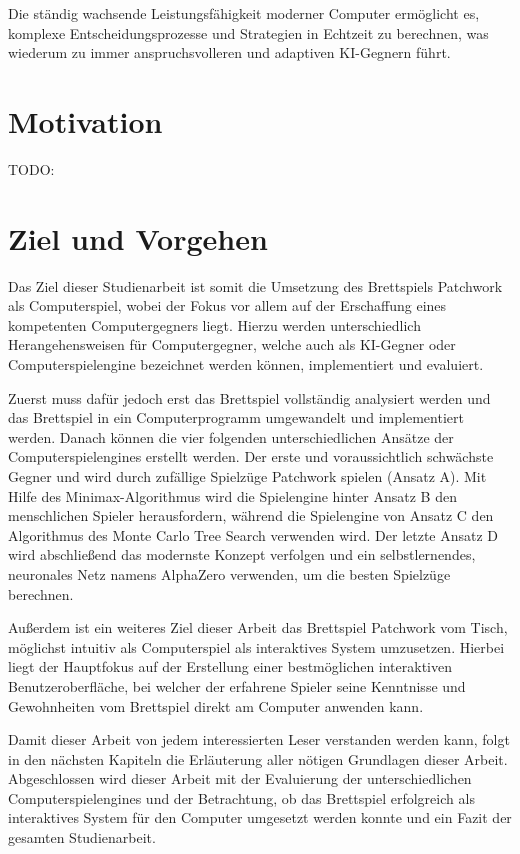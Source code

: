 Die ständig wachsende Leistungsfähigkeit moderner Computer ermöglicht es, komplexe Entscheidungsprozesse und Strategien in Echtzeit zu berechnen, was wiederum zu immer anspruchsvolleren und adaptiven \ac{KI}-Gegnern führt.

\section{Motivation}
\label{chapter:motivation}

TODO:

\section{Ziel und Vorgehen}
\label{chapter:ziel-und-vorgehen}

Das Ziel dieser Studienarbeit ist somit die Umsetzung des Brettspiels Patchwork als Computerspiel, wobei der Fokus vor allem auf der Erschaffung eines kompetenten Computergegners liegt. Hierzu werden unterschiedlich Herangehensweisen für Computergegner, welche auch als \ac{KI}-Gegner oder Computerspielengine bezeichnet werden können, implementiert und evaluiert.

Zuerst muss dafür jedoch erst das Brettspiel vollständig analysiert werden und das Brettspiel in ein Computerprogramm umgewandelt und implementiert werden. Danach können die vier folgenden unterschiedlichen Ansätze der Computerspielengines erstellt werden. Der erste und voraussichtlich schwächste Gegner und wird durch zufällige Spielzüge Patchwork spielen (Ansatz A). Mit Hilfe des Minimax-Algorithmus wird die Spielengine hinter Ansatz B den menschlichen Spieler herausfordern, während die Spielengine von Ansatz C den Algorithmus des Monte Carlo Tree Search verwenden wird. Der letzte Ansatz D wird abschließend das modernste Konzept verfolgen und ein selbstlernendes, neuronales Netz namens AlphaZero verwenden, um die besten Spielzüge berechnen.

Außerdem ist ein weiteres Ziel dieser Arbeit das Brettspiel Patchwork vom Tisch, möglichst intuitiv als Computerspiel als interaktives System umzusetzen. Hierbei liegt der Hauptfokus auf der Erstellung einer bestmöglichen interaktiven Benutzeroberfläche, bei welcher der erfahrene Spieler seine Kenntnisse und Gewohnheiten vom Brettspiel direkt am Computer anwenden kann.

Damit dieser Arbeit von jedem interessierten Leser verstanden werden kann, folgt in den nächsten Kapiteln die Erläuterung aller nötigen Grundlagen dieser Arbeit. Abgeschlossen wird dieser Arbeit mit der Evaluierung der unterschiedlichen Computerspielengines und der Betrachtung, ob das Brettspiel erfolgreich als interaktives System für den Computer umgesetzt werden konnte und ein Fazit der gesamten Studienarbeit.
